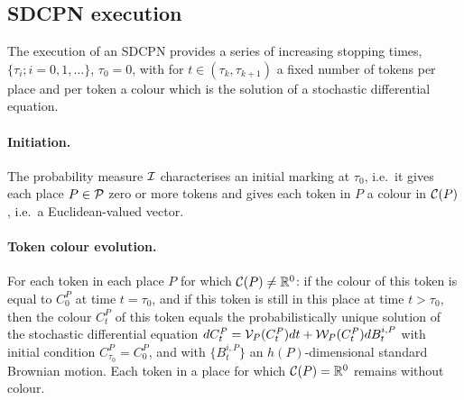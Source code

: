 \documentclass[copyright,creativecommons]{eptcs}
\begin{document}
\subsection{SDCPN execution}
\label{subsec:SDCPN execution}

The execution of an SDCPN provides a series of increasing stopping
times, $\{ \tau_i ; i=0, 1, \ldots \}$, $\tau_0 =0$, with for $t \in
(\tau_k,\tau_{k+1})$ a fixed number of tokens per place and per
token a colour which is the solution of a stochastic differential
equation.

\paragraph{Initiation.}
The probability measure ${\cal I}$ characterises an initial
marking at $\tau_0$, i.e.\ it gives each place $P \in {\cal
P}$ zero or more tokens and gives each token in $P$ a colour in
${\cal C}(P)$, i.e.\ a Euclidean-valued vector.

\paragraph{Token colour evolution.}
For each token in each place $P$ for which ${\cal C}(P) \neq
\mathbb{R}^0$: if the colour of this token is equal to $C_0^P$ at
time $t=\tau_0$, and if this token is still in this place at time
$t > \tau_0$, then the colour $C_t^P$ of this token equals the
probabilistically unique solution of the stochastic differential
equation $dC_t^P= {\cal V}_P(C_t^P)dt +{\cal
W}_P(C_t^P)dB_t^{i,P}$ with initial condition $C_{\tau_0}^P =
C_0^P$, and with $\{B_t^{i,P}\}$ an $h(P)$-dimensional standard
Brownian motion. Each token in a place for which ${\cal C}(P)
= \mathbb{R}^0$ remains without colour.
\end{document}
